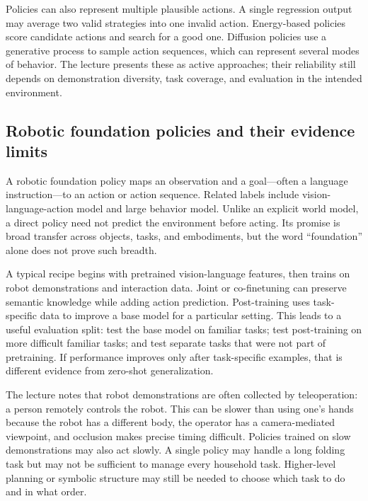 Policies can also represent multiple plausible actions. A single regression output may average two valid strategies into one invalid action. Energy-based policies score candidate actions and search for a good one. Diffusion policies use a generative process to sample action sequences, which can represent several modes of behavior. The lecture presents these as active approaches; their reliability still depends on demonstration diversity, task coverage, and evaluation in the intended environment.

\subsection{Robotic foundation policies and their evidence limits}\label{04-visual-computing-ii-ch034-robotic-foundation-policies-and-their-evidence-limits}

A robotic foundation policy maps an observation and a goal---often a language instruction---to an action or action sequence. Related labels include vision-language-action model and large behavior model. Unlike an explicit world model, a direct policy need not predict the environment before acting. Its promise is broad transfer across objects, tasks, and embodiments, but the word ``foundation'' alone does not prove such breadth.

A typical recipe begins with pretrained vision-language features, then trains on robot demonstrations and interaction data. Joint or co-finetuning can preserve semantic knowledge while adding action prediction. Post-training uses task-specific data to improve a base model for a particular setting. This leads to a useful evaluation split: test the base model on familiar tasks; test post-training on more difficult familiar tasks; and test separate tasks that were not part of pretraining. If performance improves only after task-specific examples, that is different evidence from zero-shot generalization.

The lecture notes that robot demonstrations are often collected by teleoperation: a person remotely controls the robot. This can be slower than using one's hands because the robot has a different body, the operator has a camera-mediated viewpoint, and occlusion makes precise timing difficult. Policies trained on slow demonstrations may also act slowly. A single policy may handle a long folding task but may not be sufficient to manage every household task. Higher-level planning or symbolic structure may still be needed to choose which task to do and in what order.

